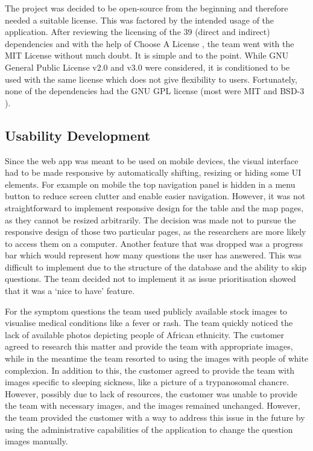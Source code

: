 \documentclass{l3proj}
\begin{document}
The project was decided to be open-source from the beginning and therefore needed a suitable license. This was factored by the intended usage of the application. After reviewing the licensing of the 39 (direct and indirect) dependencies and with the help of Choose A License \cite{ChooseALicense}, the team went with the MIT License \cite{MITL} without much doubt. It is simple and to the point. While GNU General Public License \cite{GNUGPL} v2.0 and v3.0 were considered, it is conditioned to be used with the same license which does not give flexibility to users. Fortunately, none of the dependencies had the GNU GPL license (most were MIT and BSD-3 \cite{BSDL}).

\subsection{Usability Development}
\label{subsec:us}

Since the web app was meant to be used on mobile devices, the visual interface had to be made responsive by automatically shifting, resizing or hiding some UI elements. For example on mobile the top navigation panel is hidden in a menu button to reduce screen clutter and enable easier navigation. However, it was not straightforward to implement responsive design for the table and the map pages, as they cannot be resized arbitrarily. The decision was made not to pursue the responsive design of those two particular pages, as the researchers are more likely to access them on a computer. Another feature that was dropped was a progress bar which would represent how many questions the user has answered. This was difficult to implement due to the structure of the database and the ability to skip questions. The team decided not to implement it as issue prioritisation showed that it was a `nice to have' feature.

For the symptom questions the team used publicly available stock images to visualise medical conditions like a fever or rash. The team quickly noticed the lack of available photos depicting people of African ethnicity. The customer agreed to research this matter and provide the team with appropriate images, while in the meantime the team resorted to using the images with people of white complexion. In addition to this, the customer agreed to provide the team with images specific to sleeping sickness, like a picture of a trypanosomal chancre. However, possibly due to lack of resources, the customer was unable to provide the team with necessary images, and the images remained unchanged. However, the team provided the customer with a way to address this issue in the future by using the administrative capabilities of the application to change the question images manually.
\end{document}
